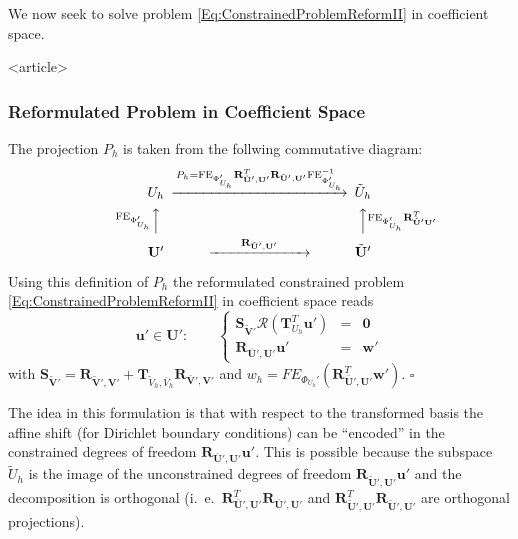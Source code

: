 We now seek to solve problem
\eqref{Eq:ConstrainedProblemReformII} in coefficient space.

\begin{frame}<article>
\frametitle<presentation>{Reformulated Problem in Coefficient Space}
The projection $P_h$ is taken from the follwing commutative diagram:
\begin{equation*}
\begin{CD}
U_h @>{P_h = \text{FE}_{\Phi'_{U_h}}
\mathbf{R}^T_{\tilde{\mathbf{U}}',\mathbf{U}'}
\mathbf{R}_{\tilde{\mathbf{U}}',\mathbf{U}'}
\text{FE}_{\Phi'_{U_h}}^{-1}}>> \tilde{U}_h\\
@A{\text{FE}_{\Phi'_{U_h}}}AA @AA{\text{FE}_{\Phi'_{U_h}}
\mathbf{R}^T_{\tilde{\mathbf{U}}'\mathbf{U}'}}A\\
\mathbf{U}' @>{\qquad\mathbf{R}_{\tilde{\mathbf{U}}',\mathbf{U}'}\qquad}>> \tilde{\mathbf{U}}'
\end{CD}
\end{equation*}

\begin{Prp}
Using this definition of $P_h$ the reformulated constrained
problem \eqref{Eq:ConstrainedProblemReformII} in coefficient space reads
\begin{equation}\label{Eq:ConstrainedProblemInCoefficientSpace}
\mathbf{u}'\in\mathbf{U}' : \qquad \left\{\begin{array}{rcl}
\mathbf{S}_{\tilde{\mathbf{V}}'}
\mathcal{R}\left(\mathbf{T}^T_{U_h}\mathbf{u}'\right)
& = & \mathbf{0}\\
\mathbf{R}_{\bar{\mathbf{U}}',\mathbf{U}'} \mathbf{u}' & = & \mathbf{w}'
\end{array}\right.
\end{equation}
with $\mathbf{S}_{\tilde{\mathbf{V}}'}=\mathbf{R}_{\tilde{\mathbf{V}}',\mathbf{V}'} +
\mathbf{T}_{\tilde{V}_h,\bar{V}_h}\mathbf{R}_{\bar{\mathbf{V}}',\mathbf{V}'}$
and $w_h =
FE_{\Phi_{U_h}'}(\mathbf{R}_{\bar{\mathbf{U}}',\mathbf{U}'}^T\mathbf{w}')$.
\hfill$\square$
\end{Prp}
\end{frame}

The idea in this formulation is that with respect to the transformed
basis the affine shift (for Dirichlet boundary conditions) can be
``encoded'' in the constrained degrees of freedom
$\mathbf{R}_{\bar{\mathbf{U}}',\mathbf{U}'} \mathbf{u}'$. This is
possible because the subspace $\tilde{U}_h$ is the image
of the unconstrained degrees of freedom
$\mathbf{R}_{\tilde{\mathbf{U}}',\mathbf{U}'} \mathbf{u}'$
and the decomposition is orthogonal
(i.~e.~$\mathbf{R}^T_{\bar{\mathbf{U}}',\mathbf{U}'}
\mathbf{R}_{\bar{\mathbf{U}}',\mathbf{U}'}$ and
$\mathbf{R}^T_{\tilde{\mathbf{U}}',\mathbf{U}'}
\mathbf{R}_{\tilde{\mathbf{U}}',\mathbf{U}'}$ are orthogonal
projections).


